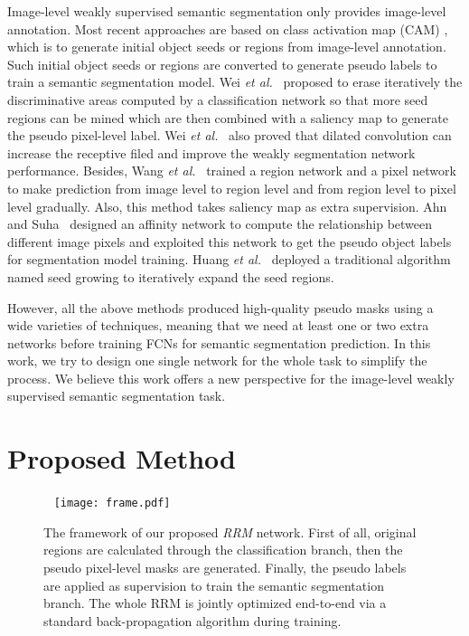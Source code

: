 \documentclass[letterpaper]{article} \usepackage{aaai20}  \usepackage{times}  \usepackage{helvet} \usepackage{courier}  \usepackage[hyphens]{url}  \usepackage{graphicx} \urlstyle{rm} \def\UrlFont{\rm}  \usepackage{graphicx}  \frenchspacing  \setlength{\pdfpagewidth}{8.5in}  \setlength{\pdfpageheight}{11in}
\begin{document}
Image-level weakly supervised semantic segmentation only provides image-level annotation. Most recent approaches are based on class activation map (CAM) \cite{zhou2016learning}, which is to generate initial object seeds or regions from image-level annotation. Such initial object seeds or regions are converted to generate pseudo labels to train a semantic segmentation model. Wei \emph{et al.}~\cite{wei2017object} proposed to  erase iteratively the discriminative areas computed by a classification network so that more seed regions can be mined which are then combined with a saliency map to generate the pseudo pixel-level label. Wei \emph{et al.}~\cite{wei2018revisiting} also proved that dilated convolution can increase the receptive filed and improve the weakly segmentation network performance. Besides, Wang \emph{et al.}~\cite{wang2018weakly} trained a region network and a pixel network to make prediction from image level to region level and from region level to pixel level gradually. Also, this method takes saliency map as extra supervision. Ahn and Suha~\cite{ahn2018learning}  designed an affinity network to compute the relationship between different image pixels and exploited this network to get the pseudo object labels for segmentation model training. Huang \emph{et al.}~\cite{huang2018weakly} deployed a traditional algorithm named seed growing to iteratively expand the seed regions. 

However, all the above methods produced high-quality pseudo masks using a wide varieties of techniques, meaning that we need at least one or two extra networks before training FCNs for semantic segmentation prediction. In this work, we try to design one single network for the whole task to simplify the process. We believe this work offers a new perspective for the image-level weakly supervised semantic segmentation task.

\section{Proposed Method}
\begin{figure*}\
	\centering
	\texttt{[image: frame.pdf]}
	\caption{The framework of our proposed \emph{RRM} network. First of all, original regions are calculated through the classification branch, then the pseudo pixel-level masks are generated. Finally, the pseudo labels are applied as supervision to train the semantic segmentation branch. The whole RRM is jointly optimized end-to-end via a standard back-propagation algorithm during training.}
	\label{fig2}
\end{figure*}
\end{document}

